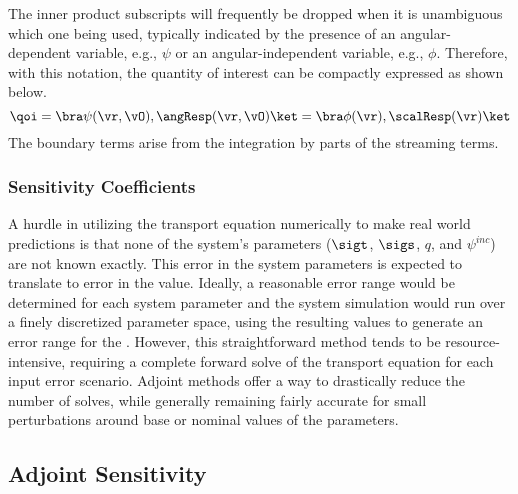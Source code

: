 The inner product subscripts will frequently be dropped when it is unambiguous which one being used, typically indicated by the presence of an angular-dependent variable, e.g., $\psi$ or an angular-independent variable, e.g., $\phi$. Therefore, with this notation, the quantity of interest can be compactly expressed as shown below.
\begin{equation}
\label{QoIDef}
\qoi = \bra \psi(\vr,\vO), \angResp(\vr,\vO) \ket  = \bra \phi(\vr) , \scalResp(\vr) \ket
\end{equation}
The boundary terms arise from the integration by parts of the streaming terms.

\subsubsection{Sensitivity Coefficients}
A hurdle in utilizing the transport equation numerically to make real world predictions is that none of the system's parameters ($\sigt$, $\sigs$, $q$, and $\psi^{inc}$) are not known exactly. This error in the system parameters is expected to translate to error in the \qoi value. Ideally, a reasonable error range would be determined for each system parameter and the system simulation would run over a finely discretized parameter space, using the resulting \qoi values to generate an error range for the \qoi. However, this straightforward method tends to be resource-intensive, requiring a complete forward solve of the transport equation for each input error scenario. Adjoint methods offer a way to drastically reduce the number of solves, while generally remaining fairly accurate for small perturbations around base or nominal values of the parameters.


\subsection{Adjoint Sensitivity}

